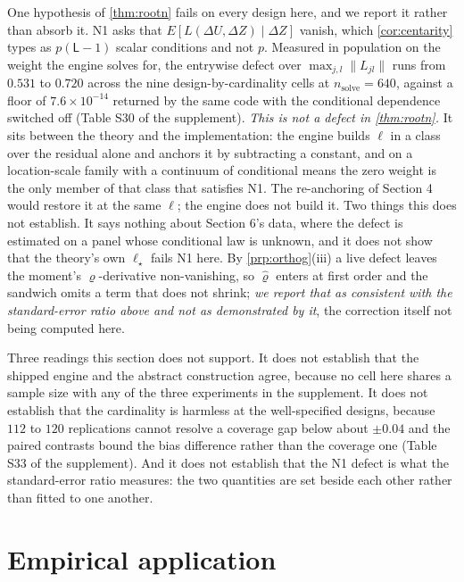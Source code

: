 \documentclass[
  12pt]{article}
\newcommand{\1}[1]{\mathds{1}\left[#1\right]}
\theoremstyle{plain}
\theoremstyle{definition}
\theoremstyle{definition}
\theoremstyle{remark}
\begin{document}
One hypothesis of \cref{thm:rootn} fails on every design here, and we
report it rather than absorb it. N1 asks that
\(E[L(\Delta U,\Delta Z)\mid\Delta Z]\) vanish, which
\cref{cor:centarity} types as \(p(\mathsf L-1)\) scalar conditions and
not \(p\). Measured in population on the weight the engine solves for,
the entrywise defect over \(\max_{j,l}\|L_{jl}\|\) runs from \(0.531\)
to \(0.720\) across the nine design-by-cardinality cells at
\(n_{\mathrm{solve}}=640\), against a floor of \(7.6\times10^{-14}\)
returned by the same code with the conditional dependence switched off
(Table S30 of the supplement). \emph{This is not a defect in
\cref{thm:rootn}.} It sits between the theory and the implementation:
the engine builds \(\ell\) in a class over the residual alone and
anchors it by subtracting a constant, and on a location-scale family
with a continuum of conditional means the zero weight is the only member
of that class that satisfies N1. The re-anchoring of Section 4 would
restore it at the same \(\ell\); the engine does not build it. Two
things this does not establish. It says nothing about Section 6's data,
where the defect is estimated on a panel whose conditional law is
unknown, and it does not show that the theory's own \(\ell_\star\) fails
N1 here. By \cref{prp:orthog}(iii) a live defect leaves the moment's
\(\varrho\)-derivative non-vanishing, so \(\hat\varrho\) enters at first
order and the sandwich omits a term that does not shrink; \emph{we
report that as consistent with the standard-error ratio above and not as
demonstrated by it}, the correction itself not being computed here.

Three readings this section does not support. It does not establish that
the shipped engine and the abstract construction agree, because no cell
here shares a sample size with any of the three experiments in the
supplement. It does not establish that the cardinality is harmless at
the well-specified designs, because \(112\) to \(120\) replications
cannot resolve a coverage gap below about \(\pm0.04\) and the paired
contrasts bound the bias difference rather than the coverage one (Table
S33 of the supplement). And it does not establish that the N1 defect is
what the standard-error ratio measures: the two quantities are set
beside each other rather than fitted to one another.

\section{Empirical application}\label{empirical-application}
\end{document}

